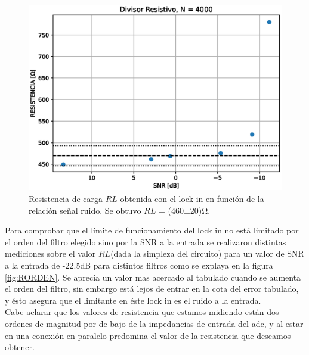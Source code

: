 \documentclass[11pt,a4paper]{extarticle}
\begin{document}
\begin{multicols}{2}
\begin{figure}[H]
	\centering
	\includegraphics[width=\linewidth]{Images/resistencia4000.eps}
	\caption{Resistencia de carga $RL$ obtenida con 
	el lock in en función
	de la relación señal ruido. Se obtuvo 
	$RL$ = (460±20)Ω.}
	\label{fig:RvsSNR}
\end{figure}

Para comprobar que el límite de funcionamiento 
del lock in no está limitado por el orden del 
filtro elegido sino por la SNR a la entrada
se realizaron distintas mediciones 
sobre el valor $RL$(dada la simpleza del circuito) 
para un valor de SNR a la entrada de -22.5dB para 
distintos filtros como se explaya en la figura 
\ref{fig:RORDEN}. Se aprecia un valor mas acercado 
al tabulado cuando se aumenta el orden del filtro, sin 
embargo está lejos de entrar en la cota del error 
tabulado, y ésto asegura que el limitante en éste 
lock in es el ruido a la entrada.\\

Cabe aclarar que los valores de resistencia que estamos
 midiendo están dos ordenes de magnitud por de 
 bajo de la impedancias de entrada del adc, y al estar en 
una conexión en paralelo predomina el valor de la resistencia 
que deseamos obtener.\\


\end{multicols}
\end{document}

